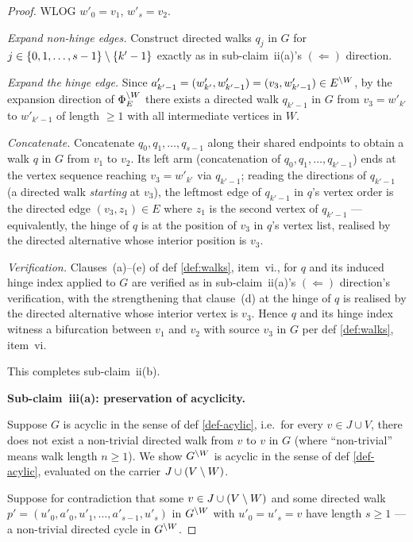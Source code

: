 \documentclass[main]{subfiles}
\begin{document}
\begin{proof}
WLOG $w'_0 = v_1$, $w'_s = v_2$.

\emph{Expand non-hinge edges.} Construct directed walks $q_j$ in $G$ for $j \in \{0, 1, \dots, s-1\} \setminus \left \{ k' - 1 \right \}$ exactly as in sub-claim~ii(a)'s $(\Leftarrow)$ direction.

\emph{Expand the hinge edge.} Since $a'_{k'-1} = (w'_{k'}, w'_{k'-1}) = (v_3, w'_{k'-1}) \in E^{\setminus W}$, by the expansion direction of $\Phi_E^{\setminus W}$ there exists a directed walk $q_{k'-1}$ in $G$ from $v_3 = w'_{k'}$ to $w'_{k'-1}$ of length $\ge 1$ with all intermediate vertices in $W$.

\emph{Concatenate.} Concatenate $q_0, q_1, \dots, q_{s-1}$ along their shared endpoints to obtain a walk $q$ in $G$ from $v_1$ to $v_2$. Its left arm (concatenation of $q_0, q_1, \dots, q_{k'-1}$) ends at the vertex sequence reaching $v_3 = w'_{k'}$ via $q_{k'-1}$; reading the directions of $q_{k'-1}$ (a directed walk \emph{starting} at $v_3$), the leftmost edge of $q_{k'-1}$ in $q$'s vertex order is the directed edge $(v_3, z_1) \in E$ where $z_1$ is the second vertex of $q_{k'-1}$ --- equivalently, the hinge of $q$ is at the position of $v_3$ in $q$'s vertex list, realised by the directed alternative whose interior position is $v_3$.

\emph{Verification.} Clauses~(a)--(e) of def \ref{def:walks}, item~vi., for $q$ and its induced hinge index applied to $G$ are verified as in sub-claim~ii(a)'s $(\Leftarrow)$ direction's verification, with the strengthening that clause~(d) at the hinge of $q$ is realised by the directed alternative whose interior vertex is $v_3$. Hence $q$ and its hinge index witness a bifurcation between $v_1$ and $v_2$ with source $v_3$ in $G$ per def \ref{def:walks}, item~vi.

This completes sub-claim~ii(b).

\medskip\noindent\textbf{Sub-claim~iii(a): preservation of acyclicity.}

Suppose $G$ is acyclic in the sense of def \ref{def-acylic}, i.e.\ for every $v \in J \cup V$, there does not exist a non-trivial directed walk from $v$ to $v$ in $G$ (where ``non-trivial'' means walk length $n \ge 1$). We show $G^{\setminus W}$ is acyclic in the sense of def \ref{def-acylic}, evaluated on the carrier $J \cup (V \setminus W)$.

Suppose for contradiction that some $v \in J \cup (V \setminus W)$ and some directed walk $p' = (u'_0, a'_0, u'_1, \dots, a'_{s-1}, u'_s)$ in $G^{\setminus W}$ with $u'_0 = u'_s = v$ have length $s \ge 1$ --- a non-trivial directed cycle in $G^{\setminus W}$.


\end{proof}
\end{document}
